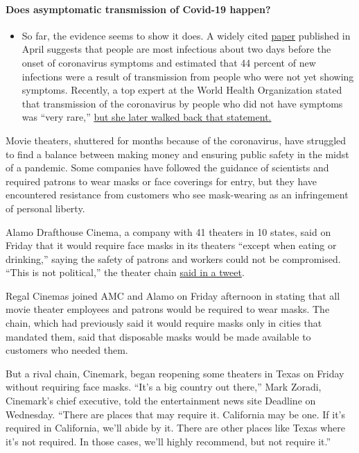\begin{itemize}
{  \paragraph{Does asymptomatic transmission of Covid-19
  happen?}\label{does-asymptomatic-transmission-of-covid-19-happen}}

  \begin{itemize}
  \tightlist
  \item
    So far, the evidence seems to show it does. A widely cited
    \href{https://www.nature.com/articles/s41591-020-0869-5}{paper}
    published in April suggests that people are most infectious about
    two days before the onset of coronavirus symptoms and estimated that
    44 percent of new infections were a result of transmission from
    people who were not yet showing symptoms. Recently, a top expert at
    the World Health Organization stated that transmission of the
    coronavirus by people who did not have symptoms was ``very rare,''
    \href{https://www.nytimes.com/2020/06/09/world/coronavirus-updates.html?action=click\&pgtype=Article\&state=default\&region=MAIN_CONTENT_3\&context=storylines_faq\#link-1f302e21}{but
    she later walked back that statement.}
  \end{itemize}
\end{itemize}

Movie theaters, shuttered for months because of the coronavirus, have
struggled to find a balance between making money and ensuring public
safety in the midst of a pandemic. Some companies have followed the
guidance of scientists and required patrons to wear masks or face
coverings for entry, but they have encountered resistance from customers
who see mask-wearing as an infringement of personal liberty.

Alamo Drafthouse Cinema, a company with 41 theaters in 10 states, said
on Friday that it would require face masks in its theaters ``except when
eating or drinking,'' saying the safety of patrons and workers could not
be compromised. ``This is not political,'' the theater chain
\href{https://twitter.com/alamodrafthouse/status/1274016499821404161}{said
in a tweet}.

Regal Cinemas joined AMC and Alamo on Friday afternoon in stating that
all movie theater employees and patrons would be required to wear masks.
The chain, which had previously said it would require masks only in
cities that mandated them, said that disposable masks would be made
available to customers who needed them.

But a rival chain, Cinemark, began reopening some theaters in Texas on
Friday without requiring face masks. ``It's a big country out there,''
Mark Zoradi, Cinemark's chief executive, told the entertainment news
site Deadline on Wednesday. ``There are places that may require it.
California may be one. If it's required in California, we'll abide by
it. There are other places like Texas where it's not required. In those
cases, we'll highly recommend, but not require it.''

